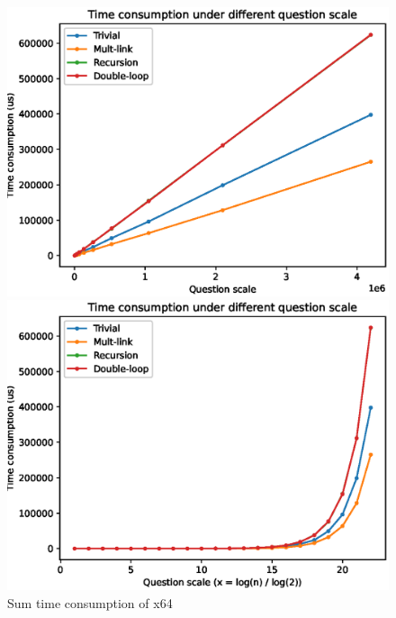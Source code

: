 \documentclass[12pt, a4paper, oneside]{ctexart}
\begin{document}
\begin{figure}[htbp]
    \centering
    \begin{minipage}{0.45\linewidth}
        \centering
        \includegraphics[scale = 0.5]{./picture/sum_x64_1.eps}
        \caption{$x = n$}
    \end{minipage}
    \centering
    \begin{minipage}{0.45\linewidth}
        \centering
        \includegraphics[scale = 0.5]{./picture/sum_x64_2.eps}
        \caption{$x = \log_2(n)$}
    \end{minipage}
    \caption{Sum time consumption of x64}
    \label{sum_x64}
\end{figure}
\end{document}
